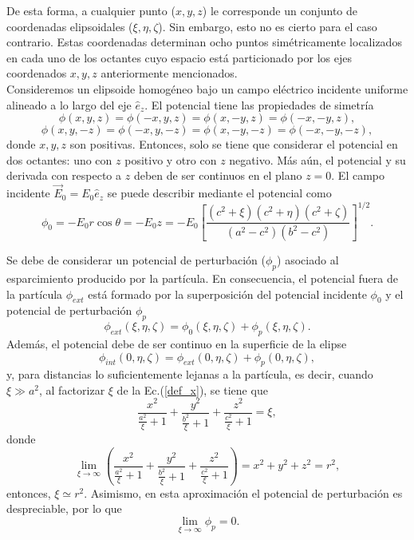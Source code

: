 \documentclass[paper=letter, fontsize=12pt,]{article}
\newcommand{\uvec}[1]{\hat{e}_{#1}}
\begin{document}
De esta forma, a cualquier punto ($x,y,z$) le corresponde un conjunto de coordenadas elipsoidales ($\xi,\eta,\zeta$). Sin embargo, esto no es cierto para el caso contrario. Estas coordenadas determinan ocho puntos simétricamente localizados en cada uno de los octantes cuyo espacio está particionado por los ejes coordenados $x,y,z$ anteriormente mencionados.\\

Consideremos un elipsoide homogéneo bajo un campo eléctrico incidente uniforme alineado a lo largo del eje $\uvec{z}$. El potencial tiene las propiedades de simetría
\begin{equation}
    \phi(x,y,z)=\phi(-x,y,z)=\phi(x,-y,z)=\phi(-x,-y,z),
\end{equation}
\begin{equation}
    \phi(x,y,-z)=\phi(-x,y,-z)=\phi(x,-y,-z)=\phi(-x,-y,-z),
\end{equation}
donde $x,y,z$ son positivas. Entonces, solo se tiene que considerar el potencial en dos octantes: uno con $z$ positivo y otro con $z$ negativo. Más aún, el potencial y su derivada con respecto a $z$ deben de ser continuos en el plano $z=0$. El campo incidente $\Vec{E}_0=E_0\uvec{z}$ se puede describir mediante el potencial como
\begin{equation}
\phi_0=-E_0 r\cos\theta=-E_0 z=-E_0\left[\frac{(c^2+\xi)(c^2+\eta)(c^2+\zeta)}{(a^2-c^2)(b^2-c^2)}\right]^{1/2}. 
\label{pot_0}
\end{equation}


Se debe de considerar un potencial de perturbación ($\phi_p$) asociado al esparcimiento producido por la partícula. En consecuencia, el potencial fuera de la partícula $\phi_{ext}$ está formado por la superposición del potencial incidente $\phi_0$ y el potencial de perturbación $\phi_p$
\begin{equation}
\phi_{ext}(\xi,\eta,\zeta)=\phi_0(\xi,\eta,\zeta)+\phi_p(\xi,\eta,\zeta).    
\end{equation}
Además, el potencial debe de ser continuo en la superficie de la elipse
\begin{equation}
\phi_{int}(0,\eta,\zeta)=\phi_{ext}(0,\eta,\zeta)+\phi_p(0,\eta,\zeta),    
\end{equation}
y, para distancias lo suficientemente lejanas a la partícula, es decir, cuando $\xi\gg a^2$, al factorizar $\xi$ de  la Ec.(\ref{def_x}), se tiene que 
\begin{equation*}
    \frac{x^2}{\frac{a^2}{\xi}+1}+\frac{y^2}{\frac{b^2}{\xi}+1}+\frac{z^2}{\frac{c^2}{\xi}+1}=\xi,
\end{equation*}
donde
\begin{equation*}
    \lim_{\xi\rightarrow\infty}\left(\frac{x^2}{\frac{a^2}{\xi}+1}+\frac{y^2}{\frac{b^2}{\xi}+1}+\frac{z^2}{\frac{c^2}{\xi}+1}\right)=x^2+y^2+z^2=r^2,
\end{equation*}
entonces, $\xi \simeq r^2$. Asimismo, en esta aproximación el potencial de perturbación es despreciable, por lo que 
\begin{equation}
\lim_{\xi\rightarrow\infty}\phi_p=0
\label{limitephi_p}.
\end{equation}
\end{document}
